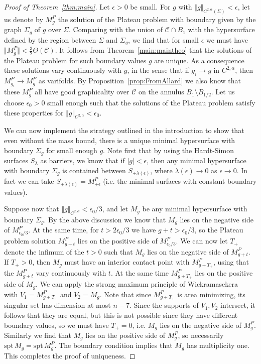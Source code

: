 \documentclass[12pt, reqno ]{amsart}
\numberwithin{equation}{section}
\begin{document}
\begin{proof}[Proof of Theorem~\ref{thm:main}]
Let $\epsilon > 0$ be small. For $g$ with $\Vert g\Vert_{C^{2,\alpha}(\Sigma)} < \epsilon$, let us denote by $M^P_g$ the solution of the Plateau problem with boundary given by the graph $\Sigma_g$ of $g$ over $\Sigma$. Comparing with the union of $\mathcal{C}\cap B_1$ with the hypersurface defined by the region between $\Sigma$ and $\Sigma_g$, we find that for small $\epsilon$ we must have $\Vert M^P_g\Vert < \frac{3}{2}\Theta(\mathcal{C})$. It follows from Theorem~\ref{main:maintheo} that the solutions of the Plateau problem for such boundary values $g$ are unique. As a consequence these solutions vary continuously with $g$, in the sense that if $g_i \to g$ in $C^{2,\alpha}$, then $M^P_{g_i} \to M^P_g$ as varifolds. By Proposition~\ref{prop:FromAllard} we also know that these $M^P_g$ all have good graphicality over $\mathcal{C}$ on the annulus $B_1\setminus B_{1/2}$. Let us choose $\epsilon_0 > 0$ small enough such that the solutions of the Plateau problem satisfy these properties for $\Vert g\Vert_{C^{2,\alpha}} < \epsilon_0$. 

We can now implement the strategy outlined in the introduction to show that even without the mass bound, there is a unique minimal hypersurface with boundary $\Sigma_g$ for small enough $g$. Note first that by using the Hardt-Simon surfaces $S_\lambda$ as barriers, we know that if $|g| < \epsilon$, then any minimal hypersurface with boundary $\Sigma_g$ is contained between $S_{\pm \lambda(\epsilon)}$, where $\lambda(\epsilon)\to 0$ as $\epsilon\to 0$. In fact we can take $S_{\pm \lambda(\epsilon)} = M^P_{\pm \epsilon}$ (i.e. the minimal surfaces with constant boundary values). 


Suppose now that $\Vert g\Vert_{C^{2,\alpha}} < \epsilon_0/3$, and let $M_{g}$ be any minimal hypersurface with boundary $\Sigma_{g}$. By the above discussion we know that $M_{g}$ lies on the negative side of $M^P_{\epsilon_0/3}$. At the same time, for $t > 2\epsilon_0/3$ we have $g+t > \epsilon_0/3$, so the Plateau problem solution $M^P_{g+t}$ lies on the positive side of $M^P_{\epsilon_0/3}$. We can now let $T_+$ denote the infimum of the $t > 0$ such that $M_g$ lies on the negative side of $M^P_{g+t}$. If $T_+ > 0$, then $M_g$ must have an interior contact point with $M^P_{g+T_+}$, using that the $M^P_{g+t}$ vary continuously with $t$. At the same time $M^P_{g+T_+}$ lies on the positive side of $M_g$. We can apply the strong maximum principle of Wickramasekera~\cite[Theorem 1.1]{Wickramasekera} with $V_1 = M^P_{g+T_+}$ and $V_2 = M_g$. Note that since $M^P_{g+T_+}$ is area minimizing, its singular set has dimension at most $n-7$. Since the supports of $V_1, V_2$ intersect, it follows that they are equal, but this is not possible since they have different boundary values, so we must have $T_+=0$, i.e. $M_g$ lies on the negative side of $M^P_g$. Similarly we find that $M_g$ lies on the positive side of $M^P_g$, so necessarily $\mathrm{spt}\, M_g = \mathrm{spt}\, M^P_g$. The boundary condition implies that $M_g$ has multiplicity one.   This completes the proof of uniqueness. 
\end{proof}


\printbibliography
\end{document}

